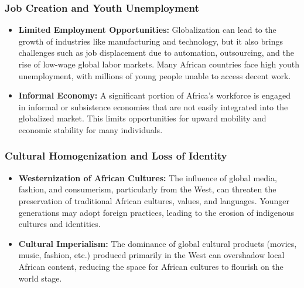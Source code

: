 \documentclass[10pt]{article}
\begin{document}
\subsubsection*{Job Creation and Youth Unemployment}
\begin{itemize}
  \item \textbf{Limited Employment Opportunities:} Globalization can lead to the growth of
    industries like manufacturing and technology, but it also brings challenges such
    as job displacement due to automation, outsourcing, and the rise of low-wage
    global labor markets. Many African countries face high youth unemployment,
    with millions of young people unable to access decent work.

  \item \textbf{Informal Economy:} A significant portion of Africa's workforce is engaged in
    informal or subsistence economies that are not easily integrated into the
    globalized market. This limits opportunities for upward mobility and economic
    stability for many individuals.
\end{itemize}

\subsubsection*{Cultural Homogenization and Loss of Identity}
\begin{itemize}
  \item \textbf{Westernization of African Cultures:} The influence of global media, fashion, and
    consumerism, particularly from the West, can threaten the preservation of
    traditional African cultures, values, and languages. Younger generations may
    adopt foreign practices, leading to the erosion of indigenous cultures and
    identities.

  \item \textbf{Cultural Imperialism:} The dominance of global cultural products (movies, music,
    fashion, etc.) produced primarily in the West can overshadow local African
    content, reducing the space for African cultures to flourish on the world stage.
\end{itemize}
\end{document}
